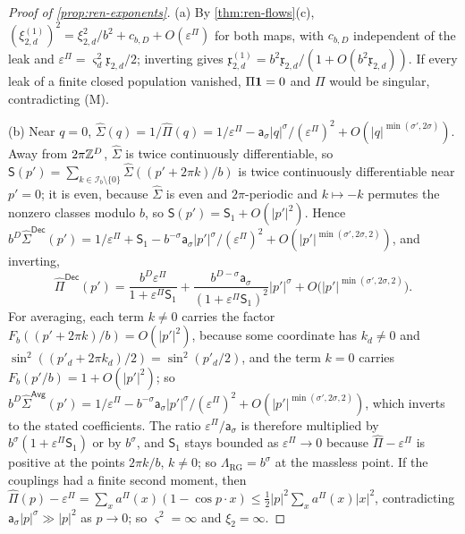 \begin{proof}[Proof of \cref{prop:ren-exponents}]
(a) By \cref{thm:ren-flows}(c), $(\xi^{(1)}_{2,d})^2=\xi^2_{2,d}/b^2+c_{b,D}+O(\varepsilon^\Pi)$ for both maps, with $c_{b,D}$ independent of the leak and $\varepsilon^\Pi=\varsigma_d^2\mathfrak x_{2,d}/2$; inverting gives $\mathfrak x^{(1)}_{2,d}=b^2\mathfrak x_{2,d}/(1+O(b^2\mathfrak x_{2,d}))$. If every leak of a finite closed population vanished, $\Pi\mathbf{1}=0$ and $\Pi$ would be singular, contradicting \textup{(M)}.

(b) Near $q=0$, $\hat\Sigma(q)=1/\hat\Pi(q)=1/\varepsilon^\Pi-\mathsf a_\sigma\lvert q\rvert^\sigma/(\varepsilon^\Pi)^2+O(\lvert q\rvert^{\min(\sigma',2\sigma)})$. Away from $2\pi\mathbb{Z}^D$, $\hat\Sigma$ is twice continuously differentiable, so $\mathsf S(p')=\sum_{k\in\mathcal I_b\setminus\{0\}}\hat\Sigma((p'+2\pi k)/b)$ is twice continuously differentiable near $p'=0$; it is even, because $\hat\Sigma$ is even and $2\pi$-periodic and $k\mapsto-k$ permutes the nonzero classes modulo $b$, so $\mathsf S(p')=\mathsf S_1+O(\lvert p'\rvert^2)$. Hence $b^D\hat\Sigma^{\mathsf{Dec}}(p')=1/\varepsilon^\Pi+\mathsf S_1-b^{-\sigma}\mathsf a_\sigma\lvert p'\rvert^\sigma/(\varepsilon^\Pi)^2+O(\lvert p'\rvert^{\min(\sigma',2\sigma,2)})$, and inverting,
\[
\hat\Pi^{\mathsf{Dec}}(p')=\frac{b^D\varepsilon^\Pi}{1+\varepsilon^\Pi\mathsf S_1}+\frac{b^{D-\sigma}\mathsf a_\sigma}{(1+\varepsilon^\Pi\mathsf S_1)^2}\lvert p'\rvert^\sigma+O\bigl(\lvert p'\rvert^{\min(\sigma',2\sigma,2)}\bigr).
\]
For averaging, each term $k\neq0$ carries the factor $F_b((p'+2\pi k)/b)=O(\lvert p'\rvert^2)$, because some coordinate has $k_d\neq0$ and $\sin^2((p'_d+2\pi k_d)/2)=\sin^2(p'_d/2)$, and the term $k=0$ carries $F_b(p'/b)=1+O(\lvert p'\rvert^2)$; so $b^D\hat\Sigma^{\mathsf{Avg}}(p')=1/\varepsilon^\Pi-b^{-\sigma}\mathsf a_\sigma\lvert p'\rvert^\sigma/(\varepsilon^\Pi)^2+O(\lvert p'\rvert^{\min(\sigma',2\sigma,2)})$, which inverts to the stated coefficients. The ratio $\varepsilon^\Pi/\mathsf a_\sigma$ is therefore multiplied by $b^\sigma(1+\varepsilon^\Pi\mathsf S_1)$ or by $b^\sigma$, and $\mathsf S_1$ stays bounded as $\varepsilon^\Pi\to0$ because $\hat\Pi-\varepsilon^\Pi$ is positive at the points $2\pi k/b$, $k\neq0$; so $\Lambda_{\mathrm{RG}}=b^\sigma$ at the massless point. If the couplings had a finite second moment, then $\hat\Pi(p)-\varepsilon^\Pi=\sum_xa^\Pi(x)(1-\cos p\cdot x)\le\frac12\lvert p\rvert^2\sum_xa^\Pi(x)\lvert x\rvert^2$, contradicting $\mathsf a_\sigma\lvert p\rvert^\sigma\gg\lvert p\rvert^2$ as $p\to0$; so $\varsigma^2=\infty$ and $\xi_2=\infty$.


\end{proof}
